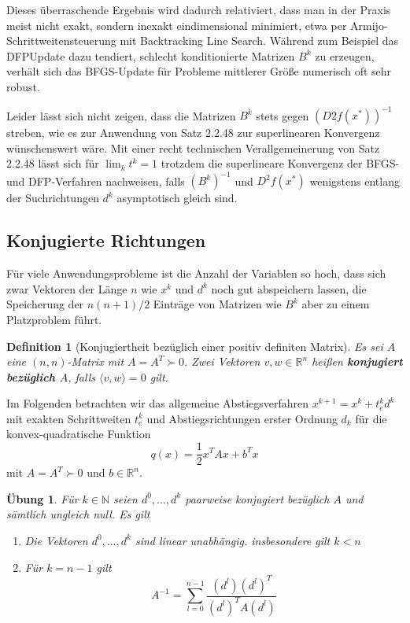 \documentclass[11pt]{scrreprt}
\newcounter{thm}
\theoremstyle{thmstyle}
\numberwithin{thm}{section}
\newtheorem{definition}[thm]{Definition}
\newtheorem{uebung}[thm]{Übung}
\begin{document}
Dieses überraschende Ergebnis wird dadurch relativiert, dass man in der Praxis meist nicht exakt, sondern inexakt eindimensional minimiert, etwa per Armijo-Schrittweitensteuerung mit Backtracking Line Search. Während zum Beispiel das DFPUpdate dazu tendiert, schlecht konditionierte Matrizen $B^k$ zu erzeugen, verhält sich das BFGS-Update für Probleme mittlerer Größe numerisch oft sehr robust. ~\bigskip

Leider lässt sich nicht zeigen, dass die Matrizen $B^k$ stets gegen $(D2f(x^*))^{-1}$ streben, wie es zur Anwendung von Satz 2.2.48 zur superlinearen Konvergenz wünschenswert wäre. Mit einer recht technischen Verallgemeinerung von Satz 2.2.48 lässt sich für $\lim_k t^k = 1$ trotzdem die superlineare Konvergenz der BFGS- und DFP-Verfahren nachweisen, falls $(B^k)^{-1}$ und $D^2 f(x^*)$ wenigstens entlang der Suchrichtungen $d^k$ asymptotisch gleich sind.
		
\subsection*{Konjugierte Richtungen}		
		
Für viele Anwendungsprobleme ist die Anzahl der Variablen so hoch, dass sich zwar Vektoren der Länge $n$ wie $x^k$ und $d^k$ noch gut abspeichern lassen, die Speicherung der $n(n + 1)/2$ Einträge von Matrizen wie $B^k$ aber zu einem Platzproblem führt.	
		
\begin{definition}[Konjugiertheit bezüglich einer positiv definiten Matrix]
	Es sei $A$ eine $(n,n)$-Matrix mit $A = A^T \succ 0$. Zwei Vektoren $v, w \in \mathbb{R}^n$ heißen \textbf{konjugiert bezüglich $A$}, falls $\langle v, w \rangle = 0$ gilt.
\end{definition}	

Im Folgenden betrachten wir das allgemeine Abstiegsverfahren $x^{k+1} = x^k + t_e^k d^k$ mit exakten Schrittweiten $t_e^k$ und Abstiegsrichtungen erster Ordnung $d_k$ für die konvex-quadratische Funktion
	$$ q(x) = \frac{1}{2}x^T A x + b^T x $$
mit $A = A^T \succ 0$ und $b \in \mathbb{R}^n$.

\begin{uebung}
	Für $k \in \mathbb{N}$ seien $d^0, \dotsc, d^k$ paarweise konjugiert bezüglich $A$ und sämtlich ungleich null. Es gilt
	\begin{enumerate}[label=\alph*\upshape)]
		\item Die Vektoren $d^0, \dotsc, d^k$ sind linear unabhängig. insbesondere gilt $k < n$
		\item Für $k = n - 1$ gilt
			$$ A^{-1} = \sum_{l=0}^{n-1} \frac{(d^l)(d^l)^T}{(d^l)^T A (d^l)} $$	
	\end{enumerate}
\end{uebung}	
		
\end{document}
